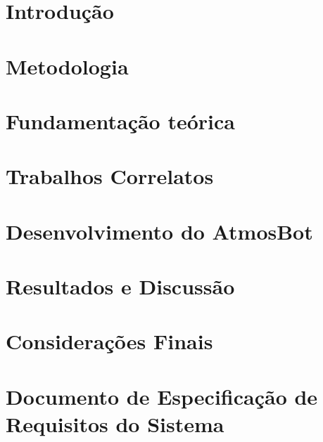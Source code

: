 \documentclass[tcc,baec]{unipampa}
\begin{document}

\chapter{Introdução}
\label{cap-introducao}


\chapter{Metodologia}
\label{cap-metodologia}


\chapter{Fundamentação teórica}
\label{cap-revisao-bibliografica}


\chapter{Trabalhos Correlatos}
\label{cap-trabalhos-relacionados}


\chapter{Desenvolvimento do AtmosBot}
\label{cap-desenvolvimento}


\chapter{Resultados e Discussão}
\label{cap-resultadosdiscussao}


\chapter{Considerações Finais}
\label{cap-consideracoesFinais}


%
%




\appendix
\chapter{Documento de Especificação de Requisitos do Sistema}
\label{appendix-requisitos}

\end{document}
